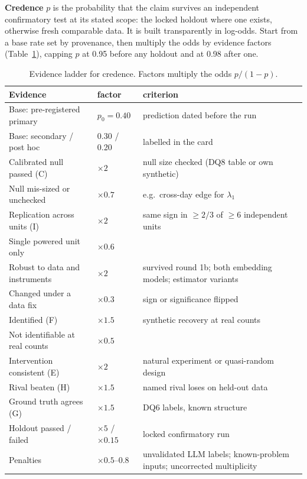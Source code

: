 \documentclass[aps,pre,reprint,10pt,nofootinbib]{revtex4-2}
\begin{document}
\textbf{Credence} $p$ is the probability that the claim survives an independent confirmatory test at its stated scope: the locked holdout where one exists, otherwise fresh comparable data. It is built transparently in log-odds. Start from a base rate set by provenance, then multiply the odds by evidence factors (Table~\ref{tab:ladder}), capping $p$ at 0.95 before any holdout and at 0.98 after one.

\begin{table}[t]
\caption{Evidence ladder for credence. Factors multiply the odds $p/(1-p)$.}
\label{tab:ladder}
\scriptsize
\begin{tabular}{@{}p{3.4cm}p{1.2cm}p{3.4cm}@{}}
\toprule
Evidence & factor & criterion \\ \midrule
Base: pre-registered primary & $p_0=0.40$ & prediction dated before the run \\
Base: secondary / post hoc & 0.30 / 0.20 & labelled in the card \\
Calibrated null passed (C) & $\times2$ & null size checked (DQ8 table or own synthetic) \\
Null mis-sized or unchecked & $\times0.7$ & e.g.\ cross-day edge for $\lambda_1$ \\
Replication across units (I) & $\times2$ & same sign in $\geq 2/3$ of $\geq 6$ independent units \\
Single powered unit only & $\times0.6$ & \\
Robust to data and instruments & $\times2$ & survived round 1b; both embedding models; estimator variants \\
Changed under a data fix & $\times0.3$ & sign or significance flipped \\
Identified (F) & $\times1.5$ & synthetic recovery at real counts \\
Not identifiable at real counts & $\times0.5$ & \\
Intervention consistent (E) & $\times2$ & natural experiment or quasi-random design \\
Rival beaten (H) & $\times1.5$ & named rival loses on held-out data \\
Ground truth agrees (G) & $\times1.5$ & DQ6 labels, known structure \\
Holdout passed / failed & $\times5$ / $\times0.15$ & locked confirmatory run \\
Penalties & $\times0.5$--$0.8$ & unvalidated LLM labels; known-problem inputs; uncorrected multiplicity \\
\bottomrule
\end{tabular}
\end{table}
\end{document}
